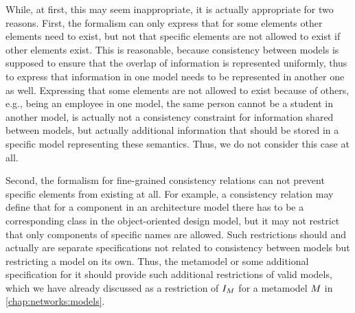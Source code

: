 While, at first, this may seem inappropriate, it is actually appropriate for two reasons.
First, the formalism can only express that for some elements other elements need to exist, but not that specific elements are not allowed to exist if other elements exist.
This is reasonable, because consistency between models is supposed to ensure that the overlap of information is represented uniformly, thus to express that information in one model needs to be represented in another one as well.
Expressing that some elements are not allowed to exist because of others, e.g., being an employee in one model, the same person cannot be a student in another model, is actually not a consistency constraint for information shared between models, but actually additional information that should be stored in a specific model representing these semantics.
Thus, we do not consider this case at all.

Second, the formalism for fine-grained consistency relations can not prevent specific elements from existing at all.
For example, a consistency relation may define that for a component in an architecture model there has to be a corresponding class in the object-oriented design model, but it may not restrict that only components of specific names are allowed.
Such restrictions should and actually are separate specifications not related to consistency between models but restricting a model on its own.
Thus, the metamodel or some additional specification for it should provide such additional restrictions of valid models, which we have already discussed as a restriction of $\metamodelinstanceset{M}{}$ for a metamodel $\metamodel{M}{}$ in \autoref{chap:networks:models}.


